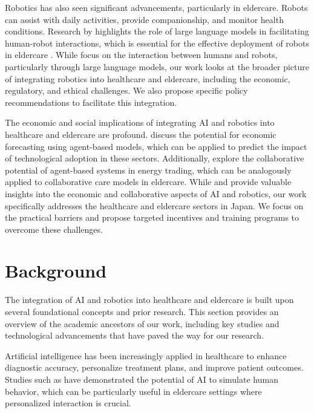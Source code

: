 \documentclass{article} %
\begin{document}
Robotics has also seen significant advancements, particularly in eldercare. Robots can assist with daily activities, provide companionship, and monitor health conditions. Research by \citet{shanahan2023role} highlights the role of large language models in facilitating human-robot interactions, which is essential for the effective deployment of robots in eldercare \citep{Lykov2023LLMMARSLL}. While \citet{shanahan2023role} focus on the interaction between humans and robots, particularly through large language models, our work looks at the broader picture of integrating robotics into healthcare and eldercare, including the economic, regulatory, and ethical challenges. We also propose specific policy recommendations to facilitate this integration.

The economic and social implications of integrating AI and robotics into healthcare and eldercare are profound. \citet{poledna2023economic} discuss the potential for economic forecasting using agent-based models, which can be applied to predict the impact of technological adoption in these sectors. Additionally, \citet{zhou2023peer} explore the collaborative potential of agent-based systems in energy trading, which can be analogously applied to collaborative care models in eldercare. While \citet{poledna2023economic} and \citet{zhou2023peer} provide valuable insights into the economic and collaborative aspects of AI and robotics, our work specifically addresses the healthcare and eldercare sectors in Japan. We focus on the practical barriers and propose targeted incentives and training programs to overcome these challenges.

\section{Background}
\label{sec:background}

The integration of AI and robotics into healthcare and eldercare is built upon several foundational concepts and prior research. This section provides an overview of the academic ancestors of our work, including key studies and technological advancements that have paved the way for our research.

Artificial intelligence has been increasingly applied in healthcare to enhance diagnostic accuracy, personalize treatment plans, and improve patient outcomes. Studies such as \citet{park2023generative} have demonstrated the potential of AI to simulate human behavior, which can be particularly useful in eldercare settings where personalized interaction is crucial.
\end{document}

